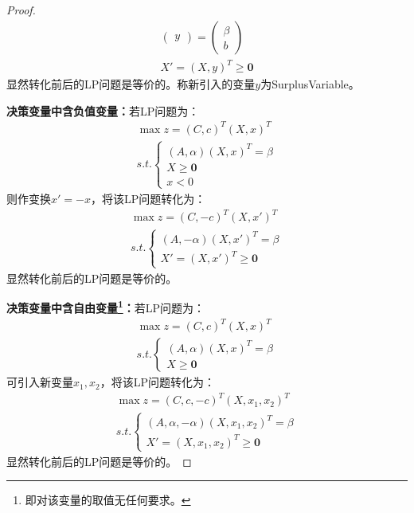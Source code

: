 \begin{proof}
\begin{gather*}
\begin{pmatrix}
			y
		\end{pmatrix}
		=
		\begin{pmatrix}
			\beta \\
			b
		\end{pmatrix} \\
		X'=(X,y)^T\geqslant\mathbf{0}
	\end{gather*}
	显然转化前后的LP问题是等价的。称新引入的变量$y$为\gls{SurplusVariable}。\par
	\textbf{决策变量中含负值变量：}若LP问题为：
	\begin{gather*}
		\max z=(C,c)^T(X,x)^T \\
		s.t.
		\begin{cases}
			(A,\alpha)(X,x)^T=\beta \\
			X\geqslant\mathbf{0} \\
			x<0
		\end{cases}
	\end{gather*}
	则作变换$x'=-x$，将该LP问题转化为：
	\begin{gather*}
		\max z=(C,-c)^T(X,x')^T \\
		s.t.
		\begin{cases}
			(A,-\alpha)(X,x')^T=\beta \\
			X'=(X,x')^T\geqslant\mathbf{0}
		\end{cases}
	\end{gather*}
	显然转化前后的LP问题是等价的。\par
	\textbf{决策变量中含自由变量\footnote{即对该变量的取值无任何要求。}：}若LP问题为：
	\begin{gather*}
		\max z=(C,c)^T(X,x)^T \\
		s.t.
		\begin{cases}
			(A,\alpha)(X,x)^T=\beta \\
			X\geqslant\mathbf{0}
		\end{cases}
	\end{gather*}
	可引入新变量$x_1,x_2$，将该LP问题转化为：
	\begin{gather*}
		\max z=(C,c,-c)^T(X,x_1,x_2)^T \\
		s.t.
		\begin{cases}
			(A,\alpha,-\alpha)(X,x_1,x_2)^T=\beta \\
			X'=(X,x_1,x_2)^T\geqslant\mathbf{0}
		\end{cases}
	\end{gather*}
	显然转化前后的LP问题是等价的。
\end{proof}
